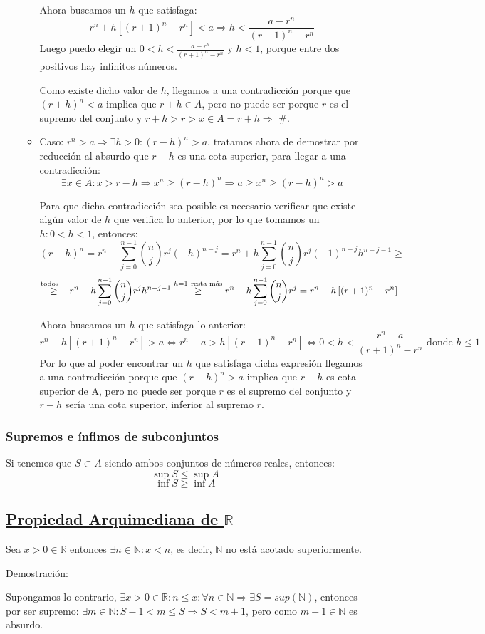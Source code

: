\documentclass[10pt,a4paper,openright]{book}
\begin{document}
\begin{enumerate}
\begin{itemize}
Ahora buscamos un $h$ que satisfaga:
$$r^n+h\left[(r+1)^n-r^n\right] <a \Rightarrow h<\frac{a-r^n}{(r+1)^n-r^n}$$
Luego puedo elegir un $0<h<\frac{a-r^n}{(r+1)^n-r^n}$ y $h<1$, porque entre dos positivos hay infinitos números.\par
Como existe dicho valor de $h$, llegamos a una contradicción porque que $(r+h)^n<a$ implica que $r+h\in A$, pero no puede ser porque $r$ es el supremo del conjunto y $r+h>r>x\in A=r+h\Rightarrow$ \#.
\vspace{0.5cm}
	\item Caso: $r^n>a\Rightarrow \exists h>0: (r-h)^n>a$, tratamos ahora de demostrar por reducción al absurdo que $r-h$ es una cota superior, para llegar a una contradicción:
$$\exists x\in A: x>r-h\Rightarrow x^n\geq (r-h)^n\Rightarrow a\geq x^n\geq (r-h)^n>a$$

Para que dicha contradicción sea posible es necesario verificar que existe algún valor de $h$ que verifica lo anterior, por lo que tomamos un $h: 0<h<1$, entonces:
$$(r-h)^n=r^n+\sum_{j=0}^{n-1}\binom{n}{j}r^j(-h)^{n-j}=r^n+h\sum_{j=0}^{n-1}\binom{n}{j}r^j(-1)^{n-j}h^{n-j-1}\geq $$
$$\stackrel{\mbox{\scriptsize{todos }}-}{\geq} r^n-h\sum_{j=0}^{n-1}\binom{n}{j}r^j h^{n-j-1}\stackrel{h=1\mbox{ \scriptsize{resta más}}}{\geq} r^n-h\sum_{j=0}^{n-1}\binom{n}{j}r^j=r^n-h\left[(r+1)^n-r^n\right]$$

Ahora buscamos un $h$ que satisfaga lo anterior:
$$r^n-h\left[(r+1)^n-r^n\right]>a\Leftrightarrow r^n-a>h\left[(r+1)^n-r^n\right]\Leftrightarrow 0<h<\frac{r^n-a}{(r+1)^n-r^n}\mbox{ donde } h\leq 1$$
Por lo que al poder encontrar un $h$ que satisfaga dicha expresión llegamos a una contradicción porque que $(r-h)^n>a$ implica que $r-h$ es cota superior de A, pero no puede ser porque $r$ es el supremo del conjunto y $r-h$ sería una cota superior, inferior al supremo $r$.
\end{itemize}
\end{enumerate}

\subsubsection*{Supremos e ínfimos de subconjuntos}
Si tenemos que $S\subset A$ siendo ambos conjuntos de números reales, entonces:
$$\sup S\leq \sup A$$
$$\inf S\geq \inf A$$

\subsection*{\underline{Propiedad Arquimediana de $\mathbb R$}}
Sea $x>0\in \mathbb R$ entonces $\exists n\in \mathbb N: x<n$, es decir, $\mathbb N$ no está acotado superiormente.\par
\underline{Demostración}:\par
Supongamos lo contrario, $\exists x>0\in \mathbb R: n\leq x: \forall n \in \mathbb N\Rightarrow \exists S=sup(\mathbb N)$, entonces por ser supremo: $\exists m \in \mathbb N : S-1<m\leq S\Rightarrow S<m+1$, pero como $m+1\in \mathbb N$ es absurdo.
\end{document}

